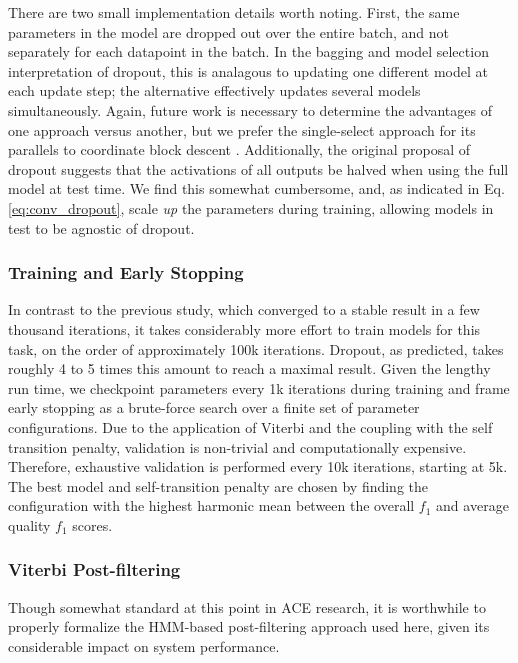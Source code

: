 There are two small implementation details worth noting.
First, the same parameters in the model are dropped out over the entire batch, and not separately for each datapoint in the batch.
In the bagging and model selection interpretation of dropout, this is analagous to updating one different model at each update step; the alternative effectively updates several models simultaneously.
Again, future work is necessary to determine the advantages of one approach versus another, but we prefer the single-select approach for its parallels to coordinate block descent \cite{somebody}.
Additionally, the original proposal of dropout suggests that the activations of all outputs be halved when using the full model at test time.
We find this somewhat cumbersome, and, as indicated in Eq. \ref{eq:conv_dropout}, scale \emph{up} the parameters during training, allowing models in test to be agnostic of dropout.


\subsubsection{Training and Early Stopping}
\label{subsubsec:early_stopping}

In contrast to the previous study, which converged to a stable result in a few thousand iterations, it takes considerably more effort to train models for this task, on the order of approximately 100k iterations.
Dropout, as predicted, takes roughly 4 to 5 times this amount to reach a maximal result.
Given the lengthy run time, we checkpoint parameters every 1k iterations during training and frame early stopping as a brute-force search over a finite set of parameter configurations.
Due to the application of Viterbi and the coupling with the self transition penalty, validation is non-trivial and computationally expensive.
Therefore, exhaustive validation is performed every 10k iterations, starting at 5k.
The best model and self-transition penalty are chosen by finding the configuration with the highest harmonic mean between the overall $f_1$ and average quality $f_1$ scores.


\subsubsection{Viterbi Post-filtering}
\label{subsubsec:viterbi}

Though somewhat standard at this point in ACE research, it is worthwhile to properly formalize the HMM-based post-filtering approach used here, given its considerable impact on system performance.



